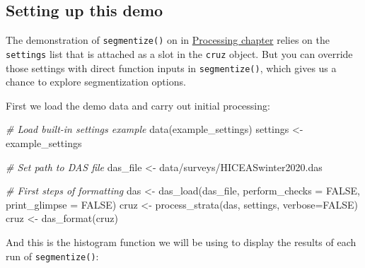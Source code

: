 \documentclass[
]{book}
\newenvironment{Shaded}{\begin{snugshade}}{\end{snugshade}}
\newcommand{\AttributeTok}[1]{\textcolor[rgb]{0.77,0.63,0.00}{#1}}
\newcommand{\CommentTok}[1]{\textcolor[rgb]{0.56,0.35,0.01}{\textit{#1}}}
\newcommand{\ConstantTok}[1]{\textcolor[rgb]{0.00,0.00,0.00}{#1}}
\newcommand{\FunctionTok}[1]{\textcolor[rgb]{0.00,0.00,0.00}{#1}}
\newcommand{\NormalTok}[1]{#1}
\newcommand{\OtherTok}[1]{\textcolor[rgb]{0.56,0.35,0.01}{#1}}
\newcommand{\StringTok}[1]{\textcolor[rgb]{0.31,0.60,0.02}{#1}}
\begin{document}
\hypertarget{setting-up-this-demo}{%
\subsection*{Setting up this demo}\label{setting-up-this-demo}}

The demonstration of \texttt{segmentize()} on in \protect\hyperlink{processing}{Processing chapter} relies on the \texttt{settings} list that is attached as a slot in the \texttt{cruz} object. But you can override those settings with direct function inputs in \texttt{segmentize()}, which gives us a chance to explore segmentization options.

First we load the demo data and carry out initial processing:

\begin{Shaded}
\begin{Highlighting}[]
\CommentTok{\# Load built{-}in settings example}
\FunctionTok{data}\NormalTok{(example\_settings)}
\NormalTok{settings }\OtherTok{\textless{}{-}}\NormalTok{ example\_settings}

\CommentTok{\# Set path to DAS file}
\NormalTok{das\_file }\OtherTok{\textless{}{-}} \StringTok{\textquotesingle{}data/surveys/HICEASwinter2020.das\textquotesingle{}}

\CommentTok{\# First steps of formatting}
\NormalTok{das }\OtherTok{\textless{}{-}} \FunctionTok{das\_load}\NormalTok{(das\_file, }
                \AttributeTok{perform\_checks =} \ConstantTok{FALSE}\NormalTok{,}
                \AttributeTok{print\_glimpse =} \ConstantTok{FALSE}\NormalTok{)}
\NormalTok{cruz }\OtherTok{\textless{}{-}} \FunctionTok{process\_strata}\NormalTok{(das,}
\NormalTok{                       settings,}
                       \AttributeTok{verbose=}\ConstantTok{FALSE}\NormalTok{)}
\NormalTok{cruz }\OtherTok{\textless{}{-}} \FunctionTok{das\_format}\NormalTok{(cruz)}
\end{Highlighting}
\end{Shaded}

And this is the histogram function we will be using to display the results of each run of \texttt{segmentize()}:
\end{document}
